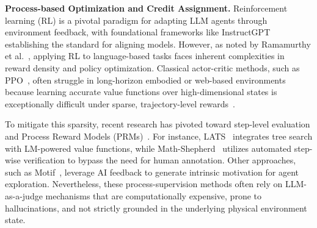 \documentclass{article}
\begin{document}

\textbf{Process-based Optimization and Credit Assignment.} 
Reinforcement learning (RL) is a pivotal paradigm for adapting LLM agents through environment feedback, with foundational frameworks like InstructGPT~\cite{NEURIPS2022_b1efde53} establishing the standard for aligning models. However, as noted by Ramamurthy et al.~\cite{ramamurthy2023is}, applying RL to language-based tasks faces inherent complexities in reward density and policy optimization. Classical actor-critic methods, such as PPO~\cite{schulman2017proximal}, often struggle in long-horizon embodied or web-based environments because learning accurate value functions over high-dimensional states is exceptionally difficult under sparse, trajectory-level rewards~\cite{NEURIPS2025_420c9f77}.

To mitigate this sparsity, recent research has pivoted toward step-level evaluation and Process Reward Models (PRMs)~\cite{lightman2024lets}. For instance, LATS~\cite{pmlr-v235-zhou24r} integrates tree search with LM-powered value functions, while Math-Shepherd~\cite{wang-etal-2024-math} utilizes automated step-wise verification to bypass the need for human annotation. Other approaches, such as Motif~\cite{klissarov2024motif}, leverage AI feedback to generate intrinsic motivation for agent exploration. Nevertheless, these process-supervision methods often rely on LLM-as-a-judge mechanisms that are computationally expensive, prone to hallucinations, and not strictly grounded in the underlying physical environment state.
\end{document}
